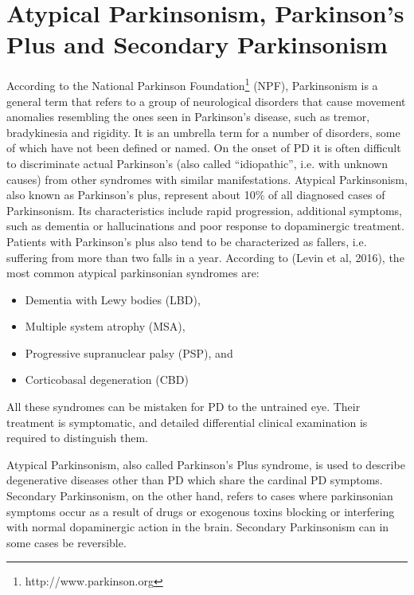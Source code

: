 
\section{Atypical Parkinsonism, Parkinson's Plus and Secondary Parkinsonism}
\label{sec:parkinsonism}
According to the National Parkinson Foundation\footnote{http://www.parkinson.org} (\gls{NPF}), Parkinsonism is a general term that refers to a group of neurological disorders that cause movement anomalies resembling the ones seen in Parkinson's disease, such as tremor, bradykinesia and rigidity. It is an umbrella term for a number of disorders, some of which have not been defined or named. On the onset of \gls{PD} it is often difficult to discriminate actual Parkinson's (also called ``idiopathic'', i.e. with unknown causes) from other syndromes with similar manifestations. Atypical Parkinsonism, also known as Parkinson's plus, represent about 10\% of all diagnosed cases of Parkinsonism. Its characteristics include rapid progression, additional symptoms, such as dementia or hallucinations and poor response to dopaminergic treatment. Patients with Parkinson's plus also tend to be characterized as fallers, i.e. suffering from more than two falls in a year.
According to (Levin et al, 2016), the most common atypical parkinsonian syndromes are: 

\begin{itemize}
\item Dementia with Lewy bodies (\gls{LBD}), 
\item Multiple system atrophy (\gls{MSA}), 
\item Progressive supranuclear palsy (\gls{PSP}), and
\item Corticobasal degeneration (\gls{CBD})
\end{itemize}

All these syndromes can be mistaken for \gls{PD} to the untrained eye. Their treatment is symptomatic, and detailed differential clinical examination is required to distinguish them. 

Atypical Parkinsonism, also called Parkinson's Plus syndrome, is used to describe degenerative diseases other than \gls{PD} which share the cardinal \gls{PD} symptoms. Secondary Parkinsonism, on the other hand, refers to cases where parkinsonian symptoms occur as a result of drugs or exogenous toxins blocking or interfering with normal dopaminergic action in the brain. Secondary Parkinsonism can in some cases be reversible. 